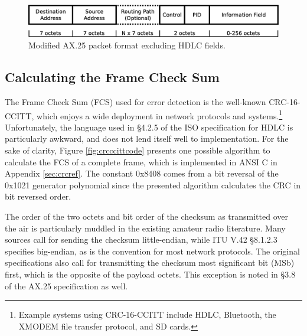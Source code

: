 \documentclass[12pt,letterpaper]{article}
\begin{document}
\begin{figure}
	\centering
	\includegraphics[width=1.0\textwidth]{src/dia/ax25}
	\caption{Modified AX.25 packet format excluding HDLC fields.}
	\label{fig:ax25format}
\end{figure}

\subsection{Calculating the Frame Check Sum}
\label{calcfcs}


The Frame Check Sum (FCS) used for error detection is the well-known CRC-16-CCITT, 
which enjoys a wide deployment in network protocols and 
systems.\footnote{Example systems using CRC-16-CCITT include HDLC, 
	Bluetooth, the XMODEM file 
transfer protocol, and SD cards.}
Unfortunately, the language used in \S4.2.5 of the ISO specification for
HDLC \cite{iso13239} is particularly awkward, 
and does not lend itself well to implementation.
For the sake of clarity, Figure \ref{fig:crcccittcode} 
presents one possible algorithm to
calculate the FCS of a complete frame, which is implemented in ANSI C in 
Appendix \ref{sec:crcref}.
The constant 0x8408 comes from a bit reversal of the 0x1021 generator polynomial
since the presented algorithm calculates the CRC in bit reversed order.

The order of the two octets and bit order of the checksum 
as transmitted over the air 
is particularly muddled in the existing amateur radio literature.
Many sources call for sending the
checksum little-endian, while ITU V.42 \S8.1.2.3 specifies big-endian,
as is the convention for most network protocols.
The original specifications also call for transmitting the checksum most
significant bit (MSb) first, which is the opposite of the payload octets.
This exception is noted in \S3.8 of the AX.25 specification as well.
\end{document}
